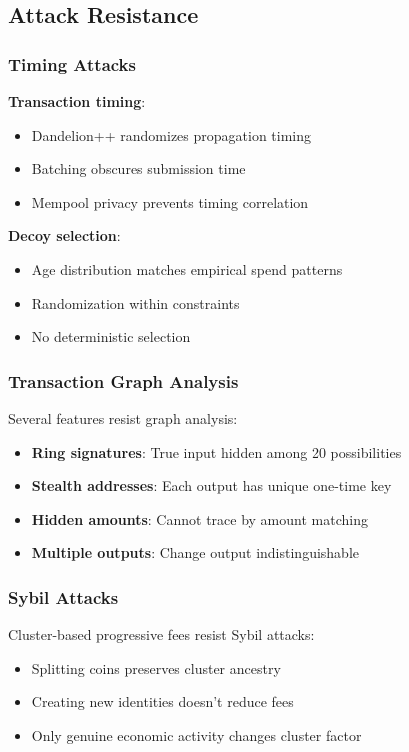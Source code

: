 \subsection{Attack Resistance}

\subsubsection{Timing Attacks}

\textbf{Transaction timing}:
\begin{itemize}
  \item Dandelion++ randomizes propagation timing
  \item Batching obscures submission time
  \item Mempool privacy prevents timing correlation
\end{itemize}

\textbf{Decoy selection}:
\begin{itemize}
  \item Age distribution matches empirical spend patterns
  \item Randomization within constraints
  \item No deterministic selection
\end{itemize}

\subsubsection{Transaction Graph Analysis}

Several features resist graph analysis:

\begin{itemize}
  \item \textbf{Ring signatures}: True input hidden among 20 possibilities
  \item \textbf{Stealth addresses}: Each output has unique one-time key
  \item \textbf{Hidden amounts}: Cannot trace by amount matching
  \item \textbf{Multiple outputs}: Change output indistinguishable
\end{itemize}

\subsubsection{Sybil Attacks}

Cluster-based progressive fees resist Sybil attacks:

\begin{itemize}
  \item Splitting coins preserves cluster ancestry
  \item Creating new identities doesn't reduce fees
  \item Only genuine economic activity changes cluster factor
\end{itemize}

